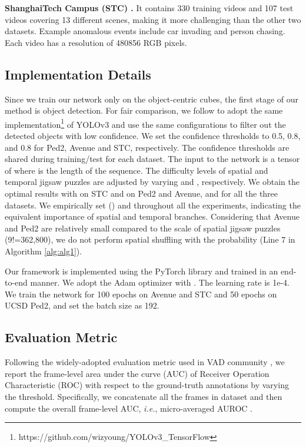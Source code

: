 \documentclass[runningheads]{llncs}
\begin{document}
\textbf{ShanghaiTech Campus (STC) \cite{luo2017revisit}. } It contains 330 training videos and 107 test videos covering 13 different scenes, making it more challenging than the other two datasets. Example anomalous events include car invading and person chasing. Each video has a resolution of 480856 RGB pixels.



\subsection{Implementation Details}
Since we train our network only on the object-centric cubes, the first stage of our method is object detection. For fair comparison, we follow \cite{georgescu2021anomaly} to adopt the same implementation\footnote{https://github.com/wizyoung/YOLOv3\_TensorFlow} of YOLOv3 \cite{redmon2018yolov3} and use the same configurations to filter out the detected objects with low confidence. We set the confidence thresholds to 0.5, 0.8, and 0.8 for Ped2, Avenue and STC, respectively. The confidence thresholds are shared during training/test for each dataset. The input to the network is a tensor of  where  is the length of the sequence. The difficulty levels of spatial and temporal jigsaw puzzles are adjusted by varying  and , respectively. We obtain the optimal results with  on STC and  on Ped2 and Avenue, and  for all the three datasets. We empirically set  () and  throughout all the experiments, indicating the equivalent importance of spatial and temporal branches. Considering that Avenue and Ped2 are relatively small compared to the scale of spatial jigsaw puzzles (9!=362,800), we do not perform spatial shuffling with the probability  (Line 7 in Algorithm \ref{alg:alg1}). 

Our framework is implemented using the PyTorch library \cite{paszke2017automatic} and trained in an end-to-end manner. We adopt the Adam optimizer with . The learning rate is 1e-4. We train the network for 100 epochs on Avenue and STC and 50 epochs on UCSD Ped2, and set the batch size as 192.

\subsection{Evaluation Metric}
Following the widely-adopted evaluation metric used in VAD community \cite{liu2018future, wang2020cluster, liu2021hybrid, gong2019memorizing, MM21, yu2020cloze}, we report the frame-level area under the curve (AUC) of Receiver Operation Characteristic (ROC) with respect to the ground-truth annotations by varying the threshold. Specifically, we concatenate all the frames in dataset and then compute the overall frame-level AUC, \emph{i.e.}, micro-averaged AUROC \cite{georgescu2020background}.
\end{document}
